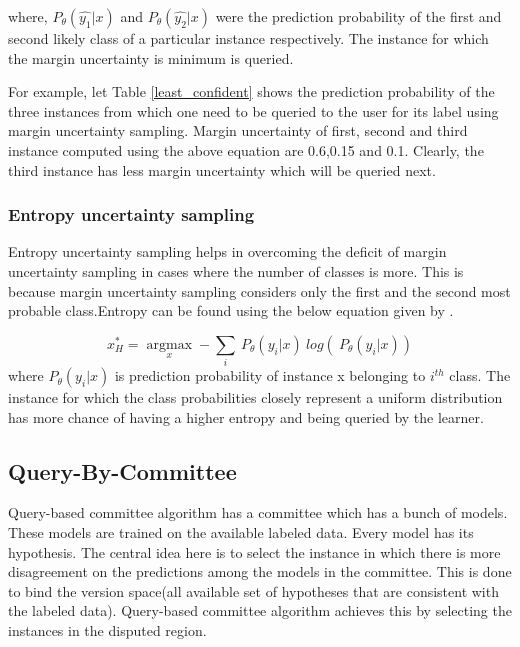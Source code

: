 where, $P_{\theta}(\hat{y_{1}}|x)$ and $P_{\theta}(\hat{y_{2}}|x)$ were the prediction probability of the first and second likely class of a particular instance respectively. The instance for which the margin uncertainty is minimum is queried.

For example, let Table \ref{least_confident} shows the prediction probability of the three instances from which one need to be queried to the user for its label using margin uncertainty sampling. Margin uncertainty of first, second and third instance computed using the above equation are 0.6,0.15 and 0.1. Clearly, the third instance has less margin uncertainty which will be queried next.\cite{Settles2010} \cite{modal_disagree}

\subsubsection{Entropy uncertainty sampling} 
  
Entropy uncertainty sampling helps in overcoming the deficit of margin uncertainty sampling in cases where the number of classes is more. This is because margin uncertainty sampling considers only the first and the second most probable class.Entropy can be found using the below equation given by \cite{shannon1948mathematical}. 

\begin{equation} 
 x^{*}_{H} =   \operatorname*{argmax}_x - \sum_{i} ~ P_{\theta}(y_{i}|x) ~ log( ~ P_{\theta}(y_{i}|x)) 
 \end{equation} 
where $P_{\theta}(y_{i}|x)$ is prediction probability of instance x belonging to $i^{th}$ class. The instance for which the class probabilities closely represent a uniform distribution has more chance of having a higher entropy and being queried by the learner. \cite{Settles2010}
	
\subsection{Query-By-Committee}
Query-based committee algorithm has a committee which has a bunch of models. These models are trained on the available labeled data. Every model has its hypothesis. The central idea here is to select the instance in which there is more disagreement on the predictions among the models in the committee. This is done to bind the version space(all available set of hypotheses that are consistent with the labeled data). Query-based committee algorithm achieves this by selecting the instances in the disputed region. \cite{Settles2010} 

